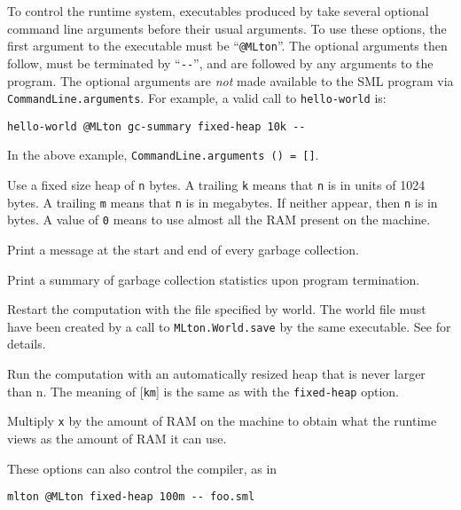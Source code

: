 To control the runtime system, executables produced by {\mlton} take
several optional command line arguments before their usual arguments.
To use these options, the first argument to the executable must be
``\verb+@MLton+''.  The optional arguments then follow, must be
terminated by ``\verb+--+'', and are followed by any arguments to the program.
The optional arguments are {\em not} made available to the SML
program via {\tt CommandLine.arguments}.  For example, a valid call
to {\tt hello-world} is: 
\begin{verbatim}
hello-world @MLton gc-summary fixed-heap 10k --
\end{verbatim}
In the above example, {\tt CommandLine.arguments () = []}.

\begin{description}
 Use a fixed size heap of {\tt n} bytes.
 A trailing {\tt k} means that {\tt n} is in units of 1024 bytes. 
 A trailing {\tt m} means that {\tt n} is in megabytes. 
 If neither appear, then {\tt n} is in bytes.
 A value of {\tt 0} means to use almost all the RAM present on the
 machine.

Print a message at the start and end of every garbage collection.

Print a summary of garbage collection statistics upon program
termination.

Restart the computation with the file specified by world.
The world file must have been created by a call to
{\tt MLton.World.save} by the same executable.  See 
for details.

Run the computation with an automatically resized heap that is never
larger than n.  The meaning of [{\tt km}] is the same as with the
{\tt fixed-heap} option.

Multiply {\tt x} by the amount of RAM on the machine to obtain what
the runtime views as the amount of RAM it can use.
\end{description}
These options can also control the compiler, as in
\begin{verbatim}
mlton @MLton fixed-heap 100m -- foo.sml
\end{verbatim}
